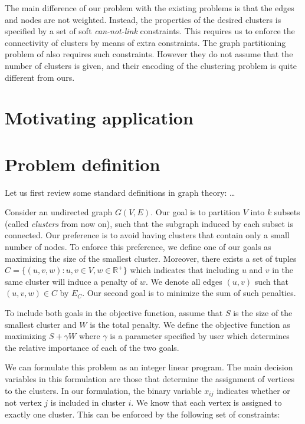 \documentclass[conference,compsoc]{IEEEtran}
\begin{document}
The main difference of our problem with the existing problems is that the edges and nodes are not weighted. Instead, the properties of the desired clusters is specified by a set of soft \emph{can-not-link} constraints. This requires us to enforce the connectivity of clusters by means of extra constraints. The graph partitioning problem of \cite{connected} also requires such constraints. However they do not assume that the number of clusters is given, and their encoding of the clustering problem is quite different from ours. 

\section{Motivating application}
\label{sec:motivation}

\section{Problem definition}
\label{sec:definition}

Let us first review some standard definitions in graph theory: \ldots

Consider an undirected graph $G(V, E)$. Our goal is to partition $V$
into $k$ subsets (called \emph{clusters} from now on), such that the
subgraph induced by each subset is connected. Our preference is to avoid
having clusters that contain only a small number of nodes. To enforce
this preference, we define one of our goals as maximizing the size of
the smallest cluster. Moreover, there exists a set of tuples
$C = \{(u, v, w): u, v \in V, w \in \mathbb{R}^+\}$ which indicates that
including $u$ and $v$ in the same cluster will induce a penalty of $w$. We denote all edges $(u, v)$ such that $(u, v, w) \in C$ by $E_C$. Our second goal is to minimize the sum of such penalties.

To include both goals in the objective function, assume that $S$ is the
size of the smallest cluster and $W$ is the total penalty. We define the
objective function as maximizing $S + \gamma W$ where $\gamma$ is a
parameter specified by user which determines the relative importance of
each of the two goals.

We can formulate this problem as an integer linear program. The main
decision variables in this formulation are those that determine the
assignment of vertices to the clusters. In our formulation, the binary
variable $x_{ij}$ indicates whether or not vertex $j$ is included in
cluster $i$. We know that each vertex is assigned to exactly one
cluster. This can be enforced by the following set of constraints:
\end{document}
